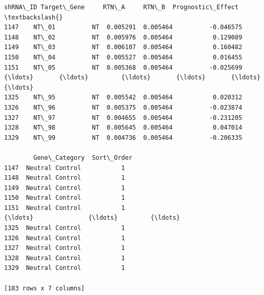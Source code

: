 \documentclass[11pt]{article}
\begin{document}
    
    \begin{Verbatim}[commandchars=\\\{\}]
     shRNA\_ID Target\_Gene     RTN\_A     RTN\_B  Prognostic\_Effect  \textbackslash{}
1147    NT\_01          NT  0.005291  0.005464          -0.046575   
1148    NT\_02          NT  0.005976  0.005464           0.129089   
1149    NT\_03          NT  0.006107  0.005464           0.160482   
1150    NT\_04          NT  0.005527  0.005464           0.016455   
1151    NT\_05          NT  0.005368  0.005464          -0.025699   
{\ldots}       {\ldots}         {\ldots}       {\ldots}       {\ldots}                {\ldots}   
1325    NT\_95          NT  0.005542  0.005464           0.020312   
1326    NT\_96          NT  0.005375  0.005464          -0.023874   
1327    NT\_97          NT  0.004655  0.005464          -0.231205   
1328    NT\_98          NT  0.005645  0.005464           0.047014   
1329    NT\_99          NT  0.004736  0.005464          -0.206335   

        Gene\_Category  Sort\_Order  
1147  Neutral Control           1  
1148  Neutral Control           1  
1149  Neutral Control           1  
1150  Neutral Control           1  
1151  Neutral Control           1  
{\ldots}               {\ldots}         {\ldots}  
1325  Neutral Control           1  
1326  Neutral Control           1  
1327  Neutral Control           1  
1328  Neutral Control           1  
1329  Neutral Control           1  

[183 rows x 7 columns]
    \end{Verbatim}
\end{document}
